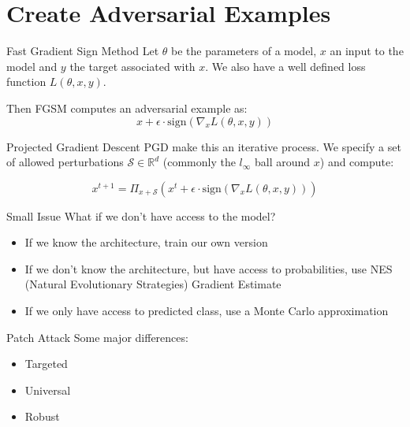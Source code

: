 \documentclass{beamer}
\begin{document}
\section{Create Adversarial Examples}

\begin{frame}{Fast Gradient Sign Method}
Let $\theta$ be the parameters of a model, $x$ an input to the model and $y$ the target associated with $x$.
We also have a well defined loss function $L(\theta, x, y)$.

\pause

Then FGSM computes an adversarial example as:
$$
x + \epsilon \cdot \text{sign}( \nabla_{x} L(\theta, x, y))
$$

\cite{Goodfellow_Shlens_Szegedy_2014}
\end{frame}

\begin{frame}{Projected Gradient Descent}
PGD make this an iterative process.
We specify a set of allowed perturbations $\mathcal{S} \in \mathbb{R}^{d}$ (commonly the $l_{\infty}$ ball around $x$) and compute:
\pause

$$
x^{t+1} = \Pi_{x + \mathcal{S}} (x^{t} + \epsilon \cdot \text{sign}(\nabla_{x} L(\theta, x, y)))
$$

\cite{Madry_Makelov_Schmidt_Tsipras_Vladu_2017}
\end{frame}

\begin{frame}{Small Issue}
What if we don't have access to the model?
\pause

\begin{itemize}
    \item If we know the architecture, train our own version
    \pause
    \item If we don't know the architecture, but have access to probabilities, use NES (Natural Evolutionary Strategies) Gradient Estimate \cite{Ilyas_Engstrom_Athalye_Lin_2018}
    \pause
    \item If we only have access to predicted class, use a Monte Carlo approximation \cite{Ilyas_Engstrom_Athalye_Lin_2018}
\end{itemize}
\end{frame}

\begin{frame}{Patch Attack}
Some major differences:
\begin{itemize}
    \item Targeted
    \pause
    \item Universal
    \pause
    \item Robust
\end{itemize}

\cite{Brown_Mané_Roy_Abadi_Gilmer_2017}
\end{frame}
\end{document}
